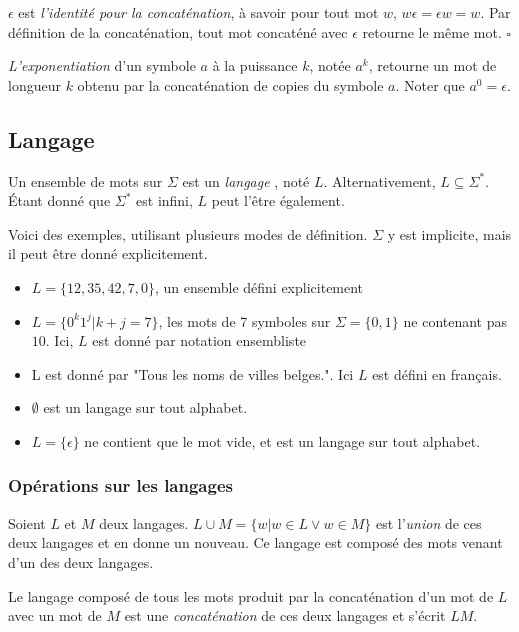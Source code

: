 \begin{lemma}
	$\epsilon$ est \emph{l'identité pour la concaténation}, à savoir pour tout mot $w$, $w\epsilon = \epsilon w = w$. Par définition de la concaténation, tout mot concaténé avec $\epsilon$ retourne le même mot. $\square$
\end{lemma}

\emph{L'exponentiation} d'un symbole $a$ à la puissance $k$, notée $a^k$, retourne un mot de longueur $k$ obtenu par la concaténation de copies du symbole $a$. Noter que $a^0=\epsilon$.

\subsection{Langage}

Un ensemble de mots sur $\Sigma$ est un \emph{langage} \cite{Hopcroft00}, noté $L$. Alternativement, $L \subseteq \Sigma^*$. Étant donné que $\Sigma^*$ est infini, $L$ peut l'être également.

\begin{exemple} Voici des exemples, utilisant plusieurs modes de définition. $\Sigma$ y est implicite, mais il peut être donné explicitement.
	\begin{itemize}
		\item $L=\{12,35,42,7,0\}$, un ensemble défini explicitement
		\item $L=\{0^k1^j|k+j=7\}$, les mots de 7 symboles sur $\Sigma=\{0,1\}$ ne contenant pas $10$. Ici, $L$ est donné par notation ensembliste
		\item L est donné par "Tous les noms de villes belges.". Ici $L$ est défini en français.
		\item $\emptyset$ est un langage sur tout alphabet.
		\item $L=\{\epsilon\}$ ne contient que le mot vide, et est un langage sur tout alphabet.
	\end{itemize}
\end{exemple}


\subsubsection*{Opérations sur les langages}

Soient $L$ et $M$ deux langages. $L \cup M = \{w | w \in L\vee w \in M\}$ est l'\emph{union} de ces deux langages et en donne un nouveau. Ce langage est composé des mots venant d'un des deux langages.

Le langage composé de tous les mots produit par la concaténation d'un mot de $L$ avec un mot de $M$ est une \emph{concaténation} de ces deux langages et s'écrit $LM$.


